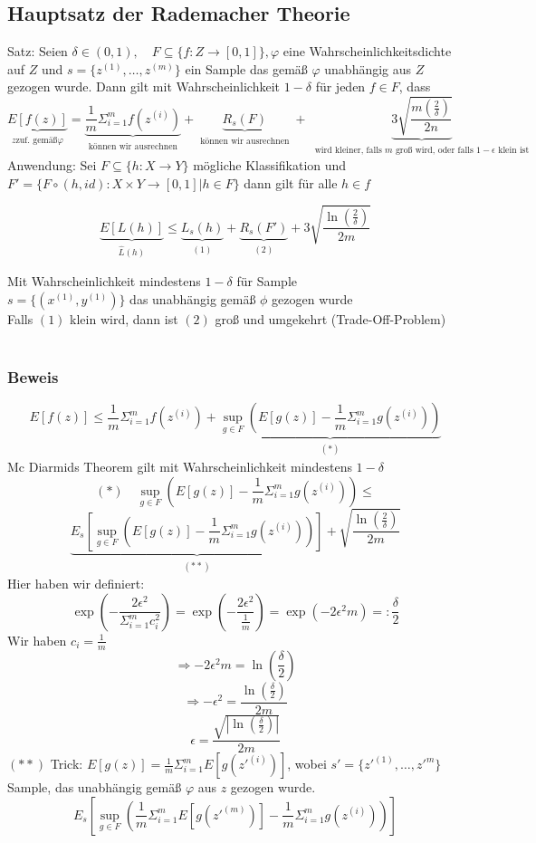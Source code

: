 \subsection*{Hauptsatz der Rademacher Theorie}
Satz: Seien $\delta \in (0,1), \quad F \subseteq \{f: Z \rightarrow [0,1]\}, \varphi$ eine Wahrscheinlichkeitsdichte auf $Z$ und $s= \{z^{(1)}, \dots , z^{(m)}\}$ ein Sample das gemäß $\varphi$ unabhängig aus $Z$ gezogen wurde. Dann gilt mit Wahrscheinlichkeit $1-\delta$ für jeden $f \in F$, dass
\[\underbrace{E[f(z)]}_{\substack{z \text{zuf. gemäß} \varphi}} = \underbrace{\frac{1}{m} \Sigma^m_{i=1} f(z^{(i)})}_{\substack{\text{können wir ausrechnen}}} + \underbrace{R_s(F)}_{\substack{\text{können wir ausrechnen}}} + \underbrace{3 \sqrt{\frac{m(\frac{2}{\delta})}{2n}}}_{\substack{\text{ wird kleiner, falls }  m \text{ groß wird, oder falls } 1-\epsilon\text{ klein ist }}}\]
Anwendung: Sei $F \subseteq \{h: X \rightarrow Y\}$ mögliche Klassifikation und $F' = \{F \circ (h, id): X \times Y \rightarrow [0,1] | h \in F\}$ dann gilt für alle $h \in f$
\begin{framed}
\[ \underbrace{E[L(h)]}_{\substack{\hat{L}(h)}} \leq \underbrace{L_s(h)}_{\substack{(1)}} + \underbrace{R_s(F')}_{\substack{(2)}} +3\sqrt{\frac{\ln (\frac{2}{\delta})}{2m}}\]
\end{framed}
Mit Wahrscheinlichkeit mindestens $1-\delta$ für Sample\\
$s = \{(x^{(1)},y^{(1)})\}$ das unabhängig gemäß $\phi$ gezogen wurde\\
Falls $(1)$ klein wird, dann ist $(2)$ groß und umgekehrt (Trade-Off-Problem)\\\\
\subsubsection*{Beweis}
\[E [f(z)] \leq \frac{1}{m} \Sigma^m_{i=1} f(z^{(i)}) + \underbrace{\underset{g \in F}{\sup} (E[g(z)] - \frac{1}{m} \Sigma^m_{i=1} g(z^{(i)}))}_{\substack{(*)}}\]
Mc Diarmids Theorem gilt mit Wahrscheinlichkeit mindestens $1-\delta$
\[(*) \quad \underset{g \in F}{\sup}(E[g(z)] - \frac{1}{m} \Sigma^m_{i=1} g(z^{(i)})) \leq\]
\[\underbrace{E_s[\underset{g\in F}{\sup}(E[g(z)] - \frac{1}{m} \Sigma^m_{i=1}g(z^{(i)}))]}_{\substack{(**)}} + \sqrt{\frac{\ln(\frac{2}{\delta})}{2m}}\]
Hier haben wir definiert:
\[\exp(- \frac{2\epsilon^2}{\Sigma^m_{i=1} c_i^2}) = \exp(- \frac{2 \epsilon^2}{\frac{1}{m}}) = \exp(-2 \epsilon^2 m) =: \frac{\delta}{2}\]
Wir haben $c_i = \frac{1}{m}$
\[\Rightarrow -2 \epsilon^2 m =  \ln (\frac{\delta}{2})\]
\[\Rightarrow - \epsilon^2 = \frac{\ln (\frac{\delta}{2})}{2m}\]
\[\epsilon = \frac{\sqrt{|\ln(\frac{\delta}{2})|}}{2m}\]
$(**)$ Trick: $E[g(z)] = \frac{1}{m} \Sigma^m_{i=1} E[g(z'^{(i)})]$, wobei $s' = \{z'^{(1)}, \dots , z'^{m}\}$ Sample, das unabhängig gemäß $\varphi$ aus $z$ gezogen wurde.
\[E_s[\underset{g \in F}{\sup} (\frac{1}{m} \Sigma^m_{i=1} E[g(z'^{(m)})] - \frac{1}{m} \Sigma^m_{i=1} g(z^{(i)}))]\]